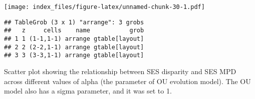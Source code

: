 \documentclass[
]{article}
\begin{document}
\texttt{[image: index\_files/figure-latex/unnamed-chunk-30-1.pdf]}

\begin{verbatim}
## TableGrob (3 x 1) "arrange": 3 grobs
##   z     cells    name           grob
## 1 1 (1-1,1-1) arrange gtable[layout]
## 2 2 (2-2,1-1) arrange gtable[layout]
## 3 3 (3-3,1-1) arrange gtable[layout]
\end{verbatim}

Scatter plot showing the relationship between SES disparity and SES MPD
across different values of alpha (the parameter of OU evolution model).
The OU model also has a sigma parameter, and it was set to 1.
\end{document}
